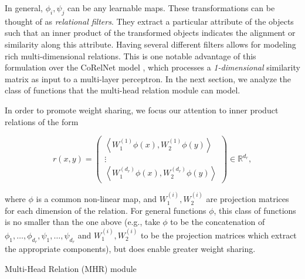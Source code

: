 In general, $\phi_i, \psi_j$ can be any learnable maps. These transformations can be thought of as \textit{relational filters}. They extract a particular attribute of the objects such that an inner product of the transformed objects indicates the alignment or similarity along this attribute. Having several different filters allows for modeling rich multi-dimensional relations. This is one notable advantage of this formulation over the CoRelNet model \citep{kerg2022neural}, which processes a \textit{1-dimensional} similarity matrix as input to a multi-layer perceptron. In the next section, we analyze the class of functions that the multi-head relation module can model.

In order to promote weight sharing, we focus our attention to inner product relations of the form

\begin{equation}\label{eq:inner_prod_rel_weight_sharing}
    r(x,y) = \begin{pmatrix} \left\langle W_1^{(1)}\phi(x), W_2^{(1)} \phi(y) \right\rangle \\  \vdots \\ \left\langle W_1^{(d_r)}\phi(x), W_2^{(d_r)} \phi(y) \right\rangle \end{pmatrix} \in \mathbb{R}^{d_r},
\end{equation}

where $\phi$ is a common non-linear map, and $W_1^{(i)}, W_2^{(i)}$ are projection matrices for each dimension of the relation. For general functions $\phi$, this class of functions is no smaller than the one above (e.g., take $\phi$ to be the concatenation of $\phi_1, \ldots, \phi_{d_r}, \psi_1, \ldots, \psi_{d_r}$ and $W_1^{(i)}, W_2^{(i)}$ to be the projection matrices which extract the appropriate components), but does enable greater weight sharing.

\begin{algorithm}[ht!]
	\caption{Multi-Head Relation (MHR) module}\label{alg:multiheadrelation}

	\vspace{1em}

\end{algorithm}

